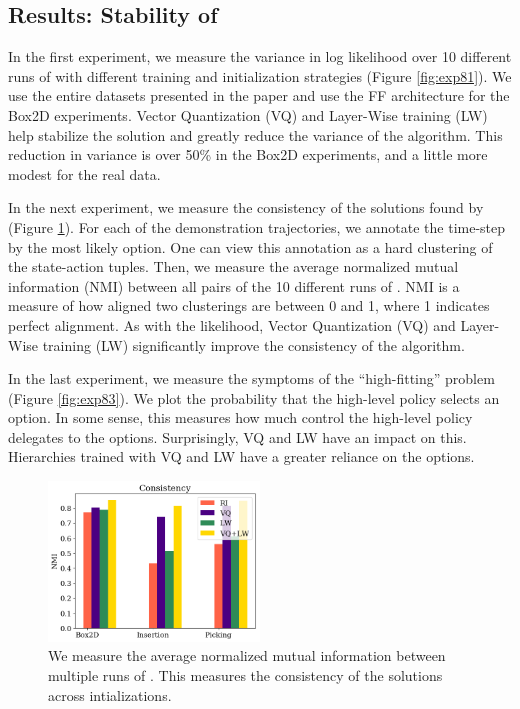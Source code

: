 \subsection*{Results: Stability of \alg}
In the first experiment, we measure the variance in log likelihood over 10 different runs of \alg with different training and initialization strategies (Figure \ref{fig:exp81}). 
We use the entire datasets presented in the paper and use the FF architecture for the Box2D experiments.
Vector Quantization (VQ) and Layer-Wise training (LW) help stabilize the solution and greatly reduce the variance of the algorithm.
This reduction in variance is over 50\% in the Box2D experiments, and a little more modest for the real data.

In the next experiment, we measure the consistency of the solutions found by \alg (Figure \ref{fig:exp82}).
For each of the demonstration trajectories, we annotate the time-step by the most likely option.
One can view this annotation as a hard clustering of the state-action tuples.
Then, we measure the average normalized mutual information (NMI) between all pairs of the 10 different runs of \alg.
NMI is a measure of how aligned two clusterings are between 0 and 1, where 1 indicates perfect alignment.
As with the likelihood, Vector Quantization (VQ) and Layer-Wise training (LW) significantly improve the consistency of the algorithm.


In the last experiment, we measure the symptoms of the ``high-fitting'' problem (Figure \ref{fig:exp83}).
We plot the probability that the high-level policy selects an option.
In some sense, this measures how much control the high-level policy delegates to the options.
Surprisingly, VQ and LW have an impact on this.
Hierarchies trained with VQ and LW have a greater reliance on the options.

\begin{figure} [ht!]
\centering
    \includegraphics[width=0.5\textwidth]{ddco-experiments/exp8-2.png}
    \caption{We measure the average normalized mutual information between multiple runs of \alg. This measures the consistency of the solutions across intializations. \label{fig:exp82}}
\end{figure}


